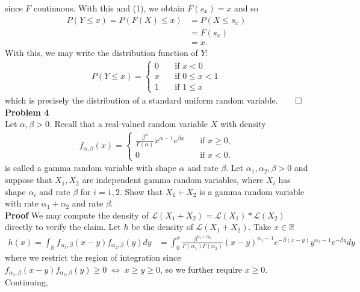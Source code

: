 \documentclass[10pt]{article}
\newcommand{\mbb}[1]{\mathbb{#1}}
\newcommand{\1}[1]{\mathbbm{1}_{#1}}
\newcommand{\mc}[1]{\mathcal{#1}}
\begin{document}
    since $F$ continuous. With this and (1), we obtain $F(s_x)=x$ and so
    \begin{align*}
        P(Y\leq x)=P(F(X)\leq x)&=P(X\leq s_x)\tag{by (2)}\\
        &=F(s_x)\\
        &=x.
    \end{align*}
    With this, we may write the distribution function of $Y$: 
    \begin{align*}
        P(Y\leq x)=\begin{cases}
            0\quad&\text{if $x<0$}\\
            x\quad&\text{if $0\leq x<1$}\\
            1\quad&\text{if $1\leq x$}
        \end{cases}
    \end{align*}
    which is precisely the distribution of a standard uniform random variable.\hfill{$\qed$}\\[5pt]
    {\bf Problem 4}\\[5pt]
    Let $\alpha,\beta>0$. Recall that a real-valued random variable $X$ with density
    \begin{align*}
        f_{\alpha,\beta}(x)=\begin{cases}
            \frac{\beta^\alpha}{\Gamma(\alpha)}x^{\alpha-1}e^{\beta x}\quad&\text{if $x\geq 0$,}\\
            0\quad&\text{if $x<0$.}
        \end{cases}
    \end{align*}
    is called a gamma random variable with shape $\alpha$ and rate $\beta$. Let $\alpha_1,\alpha_2,\beta>0$ and suppose that $X_1,X_2$ are independent gamma random variables,
    where $X_i$ has shape $\alpha_i$ and rate $\beta$ for $i=1,2$. Show that $X_1+X_2$ is a gamma random variable with rate $\alpha_1+\alpha_2$ and rate $\beta$.\\[5pt]
    {\bf Proof}\hspace{5pt} We may compute the density of $\mc{L}(X_1+X_2)=\mc{L}(X_1)\ast\mc{L}(X_2)$ directly to verify the claim. Let $h$ be the density of $\mc{L}(X_1+X_2)$. Take $x\in\mbb{R}$
    \begin{align*}
        h(x)=\int_{\mbb{R}}f_{\alpha_1,\beta}(x-y)f_{\alpha_2,\beta}(y)dy
        &=\int_0^x\frac{\beta^{\alpha_1+\alpha_2}}{\Gamma(\alpha_1)\Gamma(\alpha_2)}(x-y)^{\alpha_1-1}e^{-\beta(x-y)}y^{\alpha_2-1}e^{-\beta y}dy
    \end{align*}
    where we restrict the region of integration since $f_{\alpha_1,\beta}(x-y)f_{\alpha_2,\beta}(y)\geq 0\;\Leftrightarrow\;x\geq y\geq 0$, so we further require $x\geq 0$. Continuing,
\end{document}
